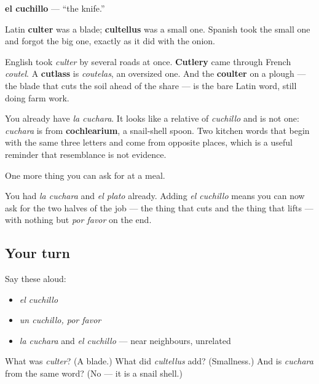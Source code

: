 \begin{cousinweb}
\textbf{el cuchillo} — \textquotedblleft{}the knife.\textquotedblright{}

Latin \textbf{culter} was a blade; \textbf{cultellus} was a small one. Spanish took the small one and forgot the big one, exactly as it did with the onion.

English took \emph{culter} by several roads at once. \textbf{Cutlery} came through French \emph{coutel}. A \textbf{cutlass} is \emph{coutelas}, an oversized one. And the \textbf{coulter} on a plough — the blade that cuts the soil ahead of the share — is the bare Latin word, still doing farm work.

You already have \emph{la cuchara}. It looks like a relative of \emph{cuchillo} and is not one: \emph{cuchara} is from \textbf{cochlearium}, a snail-shell spoon. Two kitchen words that begin with the same three letters and come from opposite places, which is a useful reminder that resemblance is not evidence.
\end{cousinweb}

\begin{grammarlens}[title={What you've built}]
One more thing you can ask for at a meal.

You had \emph{la cuchara} and \emph{el plato} already. Adding \emph{el cuchillo} means you can now ask for the two halves of the job — the thing that cuts and the thing that lifts — with nothing but \emph{por favor} on the end.
\end{grammarlens}

\subsection*{Your turn}
Say these aloud:

\begin{itemize}
\raggedright
  \item \emph{el cuchillo}
  \item \emph{un cuchillo, por favor}
  \item \emph{la cuchara} and \emph{el cuchillo} — near neighbours, unrelated
\end{itemize}

\begin{tcolorbox}[breakable,colback=teal!4,colframe=teal!35!black,title={Before you move on}]
What was \emph{culter}? (A blade.) What did \emph{cultellus} add? (Smallness.) And is \emph{cuchara} from the same word? (No — it is a snail shell.)
\end{tcolorbox}
